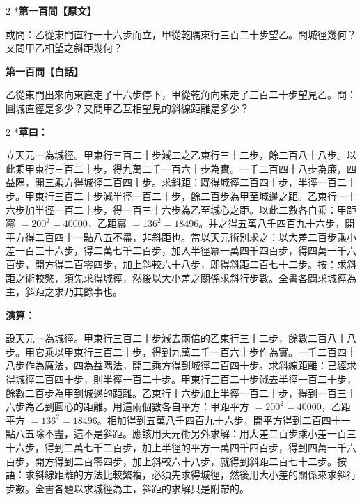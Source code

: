 \documentclass[11pt,a4paper]{article}
\begin{document}
\begin{paracol}{2}
\switchcolumn[0]*\noindent\textbf{第一百問【原文】}

\small 或問：乙從東門直行一十六步而立，甲從乾隅東行三百二十步望乙。問城徑幾何？又問甲乙相望之斜距幾何？

\switchcolumn\noindent\textbf{第一百問【白話】}

\small 乙從東門出來向東直走了十六步停下，甲從乾角向東走了三百二十步望見乙。問：圓城直徑是多少？又問甲乙互相望見的斜線距離是多少？
\end{paracol}

\vspace{0.1cm}
\noindent{}
\par\vspace{0.15cm}

\begin{paracol}{2}
\switchcolumn[0]*\textbf{草曰：}

\small 立天元一為城徑。甲東行三百二十步減二之乙東行三十二步，餘二百八十八步。以此乘甲東行三百二十步，得九萬二千一百六十步為實。一千二百四十八步為廉，四益隅，開三乘方得城徑二百四十步。求斜距：既得城徑二百四十步，半徑一百二十步。甲東行三百二十步減半徑一百二十步，餘二百步為甲至城邊之距。乙東行一十六步加半徑一百二十步，得一百三十六步為乙至城心之距。以此二數各自乘：甲距冪 $= 200^2 = 40000$，乙距冪 $= 136^2 = 18496$。并之得五萬八千四百九十六步，開平方得二百四十一點八五不盡，非斜距也。當以天元術別求之：以大差二百步乘小差一百三十六步，得二萬七千二百步，加入半徑冪一萬四千四百步，得四萬一千六百步，開方得二百零四步，加上斜較六十八步，即得斜距二百七十二步。按：求斜距之術較繁，須先求得城徑，然後以大小差之關係求斜行步數。全書各問求城徑為主，斜距之求乃其餘事也。

\switchcolumn\textbf{演算：}

\small 設天元一為城徑。甲東行三百二十步減去兩倍的乙東行三十二步，餘數二百八十八步。用它乘以甲東行三百二十步，得到九萬二千一百六十步作為實。一千二百四十八步作為廉法，四為益隅法，開三乘方得到城徑二百四十步。求斜線距離：已經求得城徑二百四十步，則半徑一百二十步。甲東行三百二十步減去半徑一百二十步，餘數二百步為甲到城邊的距離。乙東行十六步加上半徑一百二十步，得到一百三十六步為乙到圓心的距離。用這兩個數各自平方：甲距平方 $= 200^2 = 40000$，乙距平方 $= 136^2 = 18496$。相加得到五萬八千四百九十六步，開平方得到二百四十一點八五除不盡，這不是斜距。應該用天元術另外求解：用大差二百步乘小差一百三十六步，得到二萬七千二百步，加上半徑的平方一萬四千四百步，得到四萬一千六百步，開方得到二百零四步，加上斜較六十八步，就得到斜距二百七十二步。按語：求斜線距離的方法比較繁複，必須先求得城徑，然後用大小差的關係來求斜行步數。全書各題以求城徑為主，斜距的求解只是附帶的。
\end{paracol}
\end{document}
